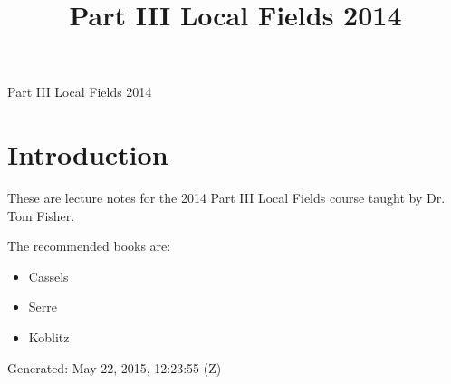 \documentclass[10pt,]{book}
\title{Part III Local Fields 2014}
\author{}
\date{}
\theoremstyle{plain}
\theoremstyle{definition}
\begin{document}
\frontmatter
\thispagestyle{empty}
\begin{center}
{\Huge Part III Local Fields 2014}
\end{center}\par
{}
\clearpage
\thispagestyle{empty}
\clearpage
\maketitle
\clearpage
\thispagestyle{empty}
\clearpage
\setcounter{tocdepth}{1}
\renewcommand*\contentsname{Contents}
\tableofcontents
\mainmatter
\typeout{************************************************}
\typeout{************************************************}
\chapter[Introduction]{Introduction}\label{chap-introduction}
These are lecture notes for the 2014 Part III Local Fields course taught by Dr. Tom Fisher.%
\par
The recommended books are:
        \begin{itemize}
\item{}Cassels\item{}Serre\item{}Koblitz\end{itemize}

\par
Generated: May 22, 2015, 12:23:55 (Z)%
\typeout{************************************************}
\typeout{************************************************}
\end{document}
